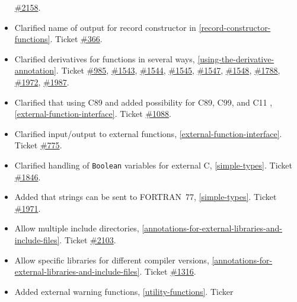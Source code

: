 \begin{itemize}
  \href{https://github.com/modelica/ModelicaSpecification/issues/2158}{\#2158}.
\item
  Clarified name of output for record constructor in \cref{record-constructor-functions}.
  Ticket \href{https://github.com/modelica/ModelicaSpecification/issues/366}{\#366}.
\item
  Clarified derivatives for functions in several ways, \cref{using-the-derivative-annotation}.
  Ticket \href{https://github.com/modelica/ModelicaSpecification/issues/985}{\#985},
  \href{https://github.com/modelica/ModelicaSpecification/issues/1543}{\#1543},
  \href{https://github.com/modelica/ModelicaSpecification/issues/1544}{\#1544},
  \href{https://github.com/modelica/ModelicaSpecification/issues/1545}{\#1545},
  \href{https://github.com/modelica/ModelicaSpecification/issues/1547}{\#1547},
  \href{https://github.com/modelica/ModelicaSpecification/issues/1548}{\#1548},
  \href{https://github.com/modelica/ModelicaSpecification/issues/1788}{\#1788},
  \href{https://github.com/modelica/ModelicaSpecification/issues/1972}{\#1972},
  \href{https://github.com/modelica/ModelicaSpecification/issues/1987}{\#1987}.
\item
  Clarified that using C89 and added possibility for C89, C99, and C11 ,
  \cref{external-function-interface}. Ticket
  \href{https://github.com/modelica/ModelicaSpecification/issues/1088}{\#1088}.
\item
  Clarified input/output to external functions, \cref{external-function-interface}. Ticket
  \href{https://github.com/modelica/ModelicaSpecification/issues/775}{\#775}.
\item
  Clarified handling of \lstinline!Boolean! variables for external C, \cref{simple-types}.
  Ticket \href{https://github.com/modelica/ModelicaSpecification/issues/1846}{\#1846}.
\item
  Added that strings can be sent to FORTRAN~77, \cref{simple-types}. Ticket
  \href{https://github.com/modelica/ModelicaSpecification/issues/1971}{\#1971}.
\item
  Allow multiple include directories, \cref{annotations-for-external-libraries-and-include-files}. Ticket
  \href{https://github.com/modelica/ModelicaSpecification/issues/2103}{\#2103}.
\item
  Allow specific libraries for different compiler versions,
  \cref{annotations-for-external-libraries-and-include-files}. Ticket
  \href{https://github.com/modelica/ModelicaSpecification/issues/1316}{\#1316}.
\item
  Added external warning functions, \cref{utility-functions}. Ticker

\end{itemize}
